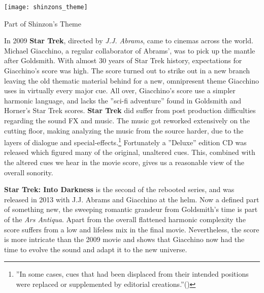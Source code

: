 \begin{marginfigure}
\texttt{[image: shinzons\_theme]}
	\caption{Part of Shinzon's Theme}
	\label{shinzons_theme}
\end{marginfigure}

In 2009 \textbf{Star Trek}, directed by \textit{J.J. Abrams}, came to cinemas across the world. Michael Giacchino, a regular collaborator of Abrams', was to pick up the mantle after Goldsmith. With almost 30 years of Star Trek history, expectations for Giacchino's score was high. The score turned out to strike out in a new branch leaving the old thematic material behind for a new, omnipresent theme Giacchino uses in virtually every major cue. All over, Giacchino's score use a simpler harmonic language, and lacks the ''sci-fi adventure'' found in Goldsmith and Horner's Star Trek scores. \textbf{Star Trek} did suffer from post production difficulties regarding the sound FX and music. The music got reworked extensively on the cutting floor, making analyzing the music from the source harder, due to the layers of dialogue and special-effects.\footnote{''In some cases, cues that had been displaced from their intended positions were replaced or supplemented by editorial creations.''(\citealt{takis_score_2010})}
Fortunately a ''Deluxe'' edition CD was released which figured many of the original, unaltered cues. This, combined with the altered cues we hear in the movie score, gives us a reasonable view of the overall sonority.

\textbf{Star Trek: Into Darkness} is the second of the rebooted series, and was released in 2013 with J.J. Abrams and Giacchino at the helm. Now a defined part of something new, the sweeping romantic grandeur from Goldsmith's time is part of the \textit{Ars Antiqua}. Apart from the overall flattened harmonic complexity the score suffers from a low and lifeless mix in the final movie. Nevertheless, the score is more intricate than the 2009 movie and shows that Giacchino now had the time to evolve the sound and adapt it to the new universe. 

